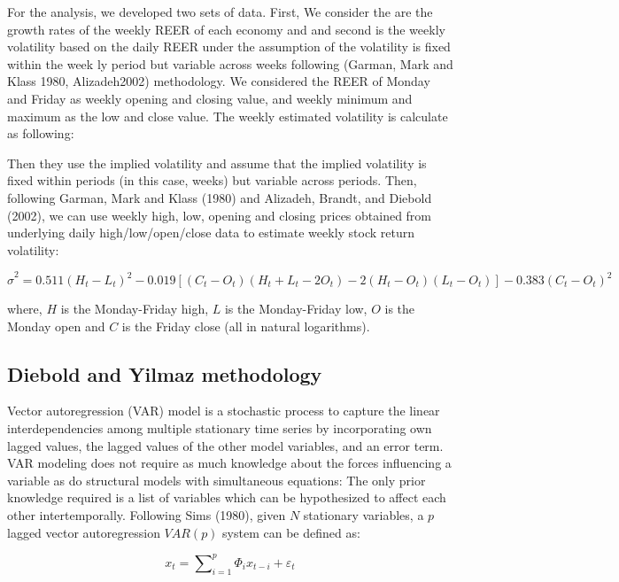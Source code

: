 \documentclass[]{elsarticle} %
\begin{document}
For the analysis, we developed two sets of data. First, We consider the
are the growth rates of the weekly REER of each economy and and second
is the weekly volatility based on the daily REER under the assumption of
the volatility is fixed within the week ly period but variable across
weeks following (Garman, Mark and Klass 1980, Alizadeh2002) methodology.
We considered the REER of Monday and Friday as weekly opening and
closing value, and weekly minimum and maximum as the low and close
value. The weekly estimated volatility is calculate as following:

Then they use the implied volatility and assume that the implied
volatility is fixed within periods (in this case, weeks) but variable
across periods. Then, following Garman, Mark and Klass (1980) and
Alizadeh, Brandt, and Diebold (2002), we can use weekly high, low,
opening and closing prices obtained from underlying daily
high/low/open/close data to estimate weekly stock return volatility:

\[{{\hat{\sigma }}^{2}}=0.511{{\left( {{H}_{t}}-{{L}_{t}} \right)}^{2}}-0.019\left[ \left( {{C}_{t}}-{{O}_{t}} \right)\left( {{H}_{t}}+{{L}_{t}}-2{{O}_{t}} \right)-2\left( {{H}_{t}}-{{O}_{t}} \right)\left( {{L}_{t}}-{{O}_{t}} \right) \right]-0.383{{\left( {{C}_{t}}-{{O}_{t}} \right)}^{2}}\]

where, \(H\) is the Monday-Friday high, \(L\) is the Monday-Friday low,
\(O\) is the Monday open and \(C\) is the Friday close (all in natural
logarithms).

\subsection{Diebold and Yilmaz
methodology}\label{diebold-and-yilmaz-methodology}

Vector autoregression (VAR) model is a stochastic process to capture the
linear interdependencies among multiple stationary time series by
incorporating own lagged values, the lagged values of the other model
variables, and an error term. VAR modeling does not require as much
knowledge about the forces influencing a variable as do structural
models with simultaneous equations: The only prior knowledge required is
a list of variables which can be hypothesized to affect each other
intertemporally. Following Sims (1980), given \(N\) stationary
variables, a \(p\) lagged vector autoregression \(VAR\left( p \right)\)
system can be defined as:

\[{{x}_{t}}=\sum\nolimits_{i=1}^{p}{{{\Phi }_{i}}{{x}_{t-i}}+{{\varepsilon }_{t}}}\]
\end{document}
